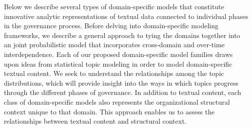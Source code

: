 Below we describe several types of domain-specific models that
constitute innovative analytic representations of textual data
connected to individual phases in the governance process. Before
delving into domain-specific modeling frameworks, we describe a
general approach to tying the domains together into an joint
probabilistic model that incorporates cross-domain and over-time
interdependence. Each of our proposed domain-specific model families
draws upon ideas from statistical topic modeling in order to model
domain-specific textual content. We seek to understand the
relationships among the topic distributions,
which will provide insight into the ways in which topics progress
through the different phases of governance.  In addition to textual
content, each class of domain-specific models also represents the
organizational structural context unique to that domain. This approach
enables us to assess the relationships between textual content and
structural context.

